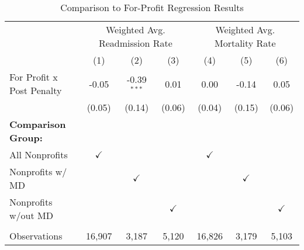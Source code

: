 \begin{table}[htbp]
   \caption{\label{tab:forprofit_fullsample} Comparison to For-Profit Regression Results}
   \bigskip
   \centering
   \begin{tabular}{lcccccc}
      \toprule
       & \multicolumn{3}{c}{Weighted Avg. Readmission Rate} & \multicolumn{3}{c}{Weighted Avg. Mortality Rate}\\
                                  & (1)           & (2)           & (3)           & (4)           & (5)           & (6)\\  
      \midrule 
      For Profit x Post Penalty   & -0.05         & -0.39$^{***}$ & 0.01          & 0.00          & -0.14         & 0.05\\   
                                  & (0.05)        & (0.14)        & (0.06)        & (0.04)        & (0.15)        & (0.06)\\   
      \textbf{Comparison Group:}  &               &               &               &               &               & \\  
      All Nonprofits              & $\checkmark$  &               &               & $\checkmark$  &               & \\  
      Nonprofits w/ MD            &               & $\checkmark$  &               &               & $\checkmark$  & \\  
      Nonprofits w/out MD         &               &               & $\checkmark$  &               &               & $\checkmark$\\   
       \\
      Observations                & 16,907        & 3,187         & 5,120         & 16,826        & 3,179         & 5,103\\  
      \bottomrule
   \end{tabular}
\end{table}